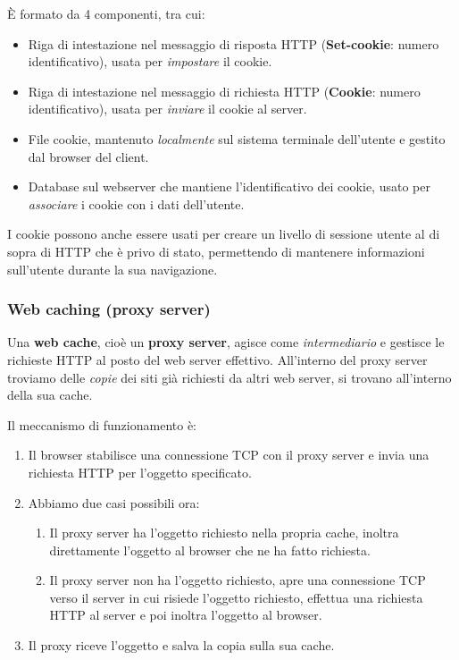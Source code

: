 È formato da 4 componenti, tra cui:
\begin{itemize}
  \item Riga di intestazione nel messaggio di risposta HTTP (\textbf{Set-cookie}: numero identificativo), usata per \textit{impostare} il cookie.
  \item Riga di intestazione nel messaggio di richiesta HTTP (\textbf{Cookie}: numero identificativo), usata per \textit{inviare} il cookie al server.
  \item File cookie, mantenuto \textit{localmente} sul sistema terminale dell'utente e gestito dal browser del client.
  \item Database sul webserver che mantiene l'identificativo dei cookie, usato per \textit{associare} i cookie con i dati dell'utente.
\end{itemize}

I cookie possono anche essere usati per creare un livello di sessione utente al di sopra di HTTP che è privo di stato, permettendo di mantenere informazioni sull'utente durante la sua navigazione.

\subsubsection{Web caching (proxy server)}

Una \textbf{web cache}, cioè un \textbf{proxy server}, agisce come \textit{intermediario} e gestisce le richieste HTTP al posto del web server effettivo. All'interno del proxy server troviamo delle \textit{copie} dei siti già richiesti da altri web server, si trovano all'interno della sua cache.

Il meccanismo di funzionamento è:
\begin{enumerate}
  \item Il browser stabilisce una connessione TCP con il proxy server e invia una richiesta HTTP per l'oggetto specificato.
  \item Abbiamo due casi possibili ora:
    \begin{enumerate}
    \item Il proxy server ha l'oggetto richiesto nella propria cache, inoltra direttamente l'oggetto al browser che ne ha fatto richiesta.
    \item Il proxy server non ha l'oggetto richiesto, apre una connessione TCP verso il server in cui risiede l'oggetto richiesto, effettua una richiesta HTTP al server e poi inoltra l'oggetto al browser.
    \end{enumerate}
  \item Il proxy riceve l'oggetto e salva la copia sulla sua cache.
\end{enumerate}

